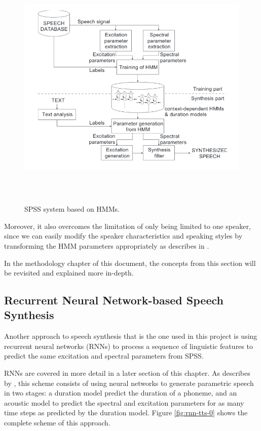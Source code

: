 \begin{figure}
    \centering
    \includegraphics[height=12cm]{figures/hts}
    \caption{SPSS system based on HMMs.}
    \label{fig:hts}
\end{figure}

Moreover, it also overcomes the limitation of only being limited to one speaker, since we can easily modify the speaker characteristics and speaking styles by transforming the HMM parameters appropriately as describes in \cite{zen2007hmm}. 

In the methodology chapter of this document, the concepts from this section will be revisited and explained more in-depth.

\subsection{Recurrent Neural Network-based Speech Synthesis} \label{sec:rnn-tts}

Another approach to speech synthesis that is the one used in this project is using recurrent neural networks (RNNs) to process a sequence of linguistic features to predict the same excitation and spectral parameters from SPSS.

RNNs are covered in more detail in a later section of this chapter. As describes by \cite{chen1998rnn}, this scheme consists of using neural networks to generate parametric speech in two stages: a duration model predict the duration of a phoneme, and an acoustic model to predict the spectral and excitation parameters for as many time steps as predicted by the duration model. Figure \ref{fig:rnn-tts-0} shows the complete scheme of this approach.

